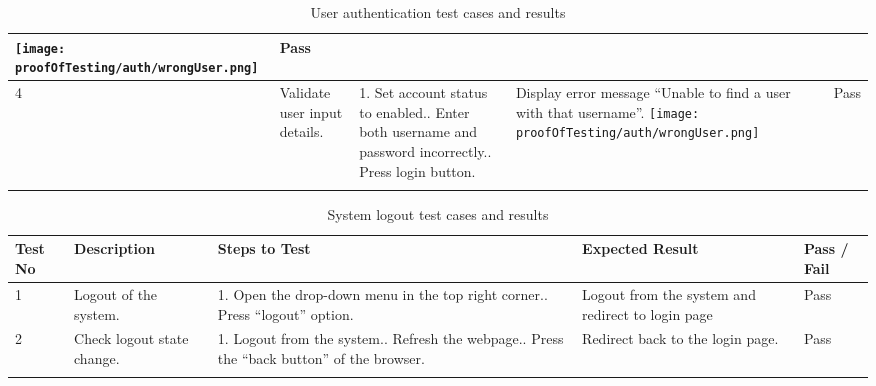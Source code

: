 \documentclass[12pt]{report}
\begin{document}
\begin{longtable}{ | p{1cm} | p{2cm} | p{4.5cm} | p{4cm} | p{1cm} | }
	\texttt{[image: proofOfTesting/auth/wrongUser.png]}
	                                                               &
	Pass                                                                                                                                             \\
	\hline
	4                                                              &
	Validate user input details.
	                                                               &
	1. Set account status to enabled.\newline
	2. Enter both username and password incorrectly.\newline
	3. Press login button.\newline
	                                                               &
	Display error message ``Unable to find a user with that username''.\newline\newline
	\texttt{[image: proofOfTesting/auth/wrongUser.png]} &
	Pass                                                                                                                                             \\
	\hline

	\caption{User authentication test cases and results}
\end{longtable}

\begin{longtable}{ | p{1cm} | p{2cm} | p{4.5cm} | p{4cm} | p{1cm} | }
	\hline
	\bf{Test No}                                      & \bf{Description} & \bf{Steps to Test} & \bf{Expected Result} & \bf{Pass / Fail} \\
	\hline
	1                                                 &
	Logout of the system.                             &
	1. Open the drop-down menu in the top right corner.\newline
	2. Press ``logout'' option.\newline
	                                                  &
	Logout from the system and redirect to login page &
	Pass                                                                                                                                \\
	\hline
	2                                                 &
	Check logout state change.
	                                                  &
	1. Logout from the system.\newline
	2. Refresh the webpage.\newline
	3. Press the ``back button'' of the browser.
	                                                  &
	Redirect back to the login page.
	                                                  &
	Pass                                                                                                                                \\
	\hline
	\caption{System logout test cases and results}
\end{longtable}
\end{document}
